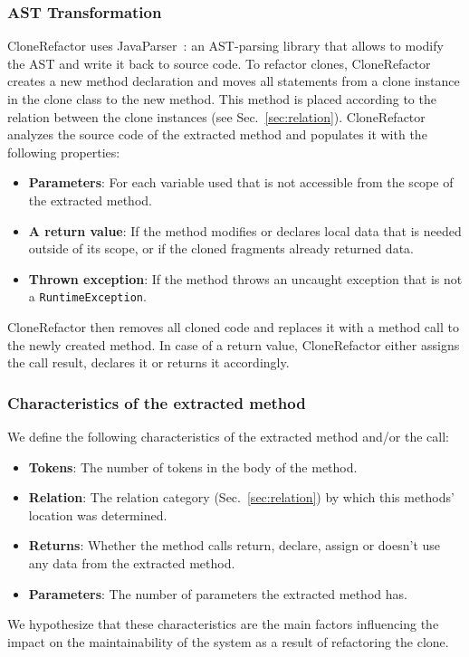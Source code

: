 \documentclass[]{IEEEtran}
\begin{document}
\subsubsection{AST Transformation}
CloneRefactor uses JavaParser~\cite{smith2017javaparser}: an AST-parsing library that allows to modify the AST and write it back to source code. To refactor clones, CloneRefactor creates a new method declaration and moves all statements from a clone instance in the clone class to the new method. This method is placed according to the relation between the clone instances (see Sec.~\ref{sec:relation}). CloneRefactor analyzes the source code of the extracted method and populates it with the following properties:
\begin{itemize}
  \item \textbf{Parameters}: For each variable used that is not accessible from the scope of the extracted method.
  \item \textbf{A return value}: If the method modifies or declares local data that is needed outside of its scope, or if the cloned fragments already returned data.
  \item \textbf{Thrown exception}: If the method throws an uncaught exception that is not a \texttt{RuntimeException}.
\end{itemize}
CloneRefactor then removes all cloned code and replaces it with a method call to the newly created method. In case of a return value, CloneRefactor either assigns the call result, declares it or returns it accordingly.

\subsubsection{Characteristics of the extracted method}\label{sec:characteristics}
We define the following characteristics of the extracted method and/or the call:
\begin{itemize}
\item \textbf{Tokens}: The number of tokens in the body of the method.
\item \textbf{Relation}: The relation category (Sec.~\ref{sec:relation}) by which this methods' location was determined.
\item \textbf{Returns}: Whether the method calls return, declare, assign or doesn't use any data from the extracted method.
\item \textbf{Parameters}: The number of parameters the extracted method has.
\end{itemize}
We hypothesize that these characteristics are the main factors influencing the impact on the maintainability of the system as a result of refactoring the clone.
\end{document}
